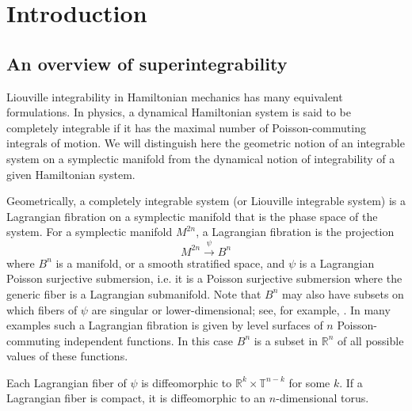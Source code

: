 \documentclass[12pt]{amsart}
\theoremstyle{definition}
\numberwithin{equation}{section}
\newcommand{\RR}{\mathbb{R}}
\begin{document}
	\date{First version, \today}
	
	\maketitle
	\tableofcontents
	
	\section{Introduction}\label{Sec:introduction}

	
\subsection{An overview of superintegrability}   Liouville integrability in Hamiltonian mechanics has many equivalent formulations. In physics, a dynamical Hamiltonian system is said to be completely integrable if it has the maximal number of Poisson-commuting integrals of motion. We will distinguish here the geometric notion of an integrable system on a symplectic manifold from the dynamical notion of integrability of a given Hamiltonian system. 

Geometrically, a completely integrable system (or Liouville integrable system)   is a Lagrangian fibration on a symplectic manifold that is the phase space of the system. For a symplectic manifold $M^{2n}$, a Lagrangian fibration is the projection 
\begin{equation}\label{Lint}
M^{2n}\stackrel{\psi}\rightarrow B^{n}
\end{equation}
where $B^{n}$ is a manifold, or a smooth stratified space, and $\psi$ is a Lagrangian Poisson surjective submersion, i.e. it is a Poisson surjective submersion where the generic fiber is a Lagrangian submanifold. Note that $B^{n}$ may also have subsets on which fibers of $\psi$ are singular or lower-dimensional; see, for example,  \cite{Zung1996,Zung2003,BF,MGRarxiv2506.16610v2}. In many examples such a Lagrangian fibration is given by level surfaces of $n$ Poisson-commuting independent functions. In this case $B^{n}$ is a subset in $\RR^n$ of all possible values of these functions.

Each Lagrangian fiber of $\psi$ is diffeomorphic to $\RR^k\times \mathbb{T}^{n-k}$ for some $k$. If a Lagrangian fiber is compact, it is diffeomorphic to an $n$-dimensional torus. 
\end{document}
